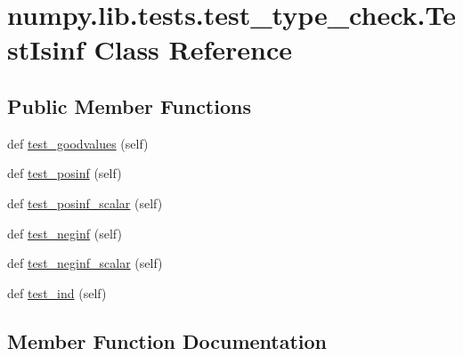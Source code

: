\hypertarget{classnumpy_1_1lib_1_1tests_1_1test__type__check_1_1TestIsinf}{}\section{numpy.\+lib.\+tests.\+test\+\_\+type\+\_\+check.\+Test\+Isinf Class Reference}
\label{classnumpy_1_1lib_1_1tests_1_1test__type__check_1_1TestIsinf}
\subsection*{Public Member Functions}
\begin{DoxyCompactItemize}
\item 
def \hyperlink{classnumpy_1_1lib_1_1tests_1_1test__type__check_1_1TestIsinf_acd76edb71ed6d111eb55bebfb1afbbeb}{test\+\_\+goodvalues} (self)
\item 
def \hyperlink{classnumpy_1_1lib_1_1tests_1_1test__type__check_1_1TestIsinf_adf4bb998003875bb004e933f6a229401}{test\+\_\+posinf} (self)
\item 
def \hyperlink{classnumpy_1_1lib_1_1tests_1_1test__type__check_1_1TestIsinf_a347c748c89b7e8acf8dfcd0860b1acc1}{test\+\_\+posinf\+\_\+scalar} (self)
\item 
def \hyperlink{classnumpy_1_1lib_1_1tests_1_1test__type__check_1_1TestIsinf_a1f5d1b36d073d7c4d8195d4219073b64}{test\+\_\+neginf} (self)
\item 
def \hyperlink{classnumpy_1_1lib_1_1tests_1_1test__type__check_1_1TestIsinf_a66e5e97b299f1397c3532918b70b44e5}{test\+\_\+neginf\+\_\+scalar} (self)
\item 
def \hyperlink{classnumpy_1_1lib_1_1tests_1_1test__type__check_1_1TestIsinf_a86a0cf6224cdaceaad784d403f57af76}{test\+\_\+ind} (self)
\end{DoxyCompactItemize}


\subsection{Member Function Documentation}
\mbox{\label{classnumpy_1_1lib_1_1tests_1_1test__type__check_1_1TestIsinf_acd76edb71ed6d111eb55bebfb1afbbeb}} 

